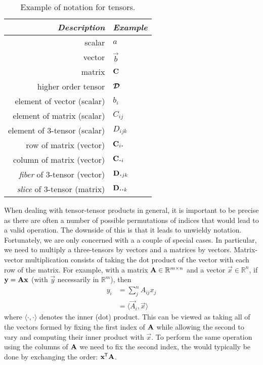 \begin{table}
\centering
\begin{tabu} to 0.5\linewidth {|r|l|}
\hline 
\textit{Description} & \textit{Example} \\
\hline
scalar & \(a\) \\
vector & \(\vec{b}\) \\
matrix & \(\mathbf{C}\) \\
higher order tensor & \(\bm{\mathcal{D}}\) \\
element of vector (scalar) & \(b_i\) \\
element of matrix (scalar) & \(C_{ij}\) \\
element of 3-tensor (scalar) & \(D_{ijk}\) \\
row of matrix (vector) & \(\vec{C}_{i\midbullet}\) \\
column of matrix (vector) & \(\vec{C}_{\midbullet i}\)\\
\textit{fiber} of 3-tensor (vector) & \(\vec{D}_{\midbullet jk}\)\\
\textit{slice} of 3-tensor (matrix) & \(\mat{D}_{\midbullet\midbullet k}\)\\
\hline
\end{tabu}
\caption{Example of notation for tensors.}
\label{tab:notation}
\end{table}

When dealing with tensor-tensor products in general, it is important to be precise as there are often
a number of possible permutations of indices that would lead to a valid operation. The downside of
this is that it leads to unwieldy notation. Fortunately, we are only concerned with a a couple of
special cases. In particular, we need to multiply a three-tensors by vectors and a matrices by
vectors. Matrix-vector multiplication consists of taking the dot product of the vector with
each row of the matrix. For example, with a matrix \(\mathbf{A} \in \mathbb{R}^{m \times n}\) and a
vector \(\vec{x} \in \mathbb{R}^n\), if \(\mathbf{y} = \mathbf{A}\mathbf{x}\) (with \(\vec{y}\) necessarily
in \(\mathbb{R}^m\)), then
\begin{align}\label{eq:matmul}
	y_i &= \sum_j^n A_{ij} x_j \\
		&= \langle \vec{A}_i, \vec{x}\rangle
\end{align} where \(\langle \cdot, \cdot \rangle\) denotes the inner (dot) product. This can be viewed
as taking all of the vectors formed by fixing the first index of \(\mathbf{A}\) while allowing the second
to vary and computing their inner product with \(\vec{x}\). To perform the same operation using the
columns of \(\mathbf{A}\) we need to fix the second index, the would typically be done by exchanging the
order: \(\mathbf{x}^{\mkern-1.5mu\mathsf{T}}\mathbf{A}\).

